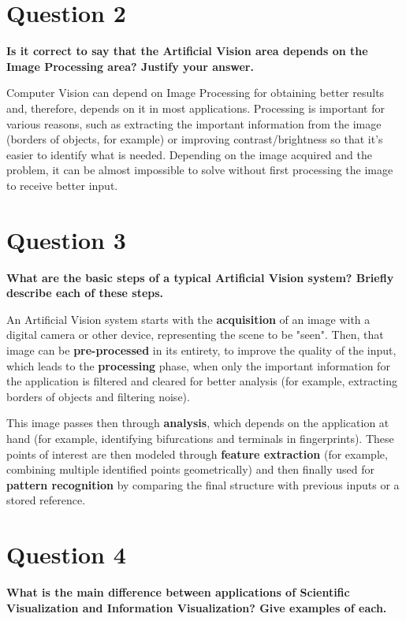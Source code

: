 \documentclass[12pt]{article}
\begin{document}
\section*{Question 2}
{\bfseries Is it correct to say that the Artificial Vision area depends on the Image Processing area?  Justify your answer.}

Computer Vision can depend on Image Processing for obtaining better results and, therefore, depends on it in most applications. Processing is important for various reasons, such as extracting the important information from the image (borders of objects, for example) or improving contrast/brightness so that it's easier to identify what is needed. Depending on the image acquired and the problem, it can be almost impossible to solve without first processing the image to receive better input.

\section*{Question 3}
{\bfseries What are the basic steps of a typical Artificial Vision system?  Briefly describe each of these steps.}

An Artificial Vision system starts with the \textbf{acquisition} of an image with a digital camera or other device, representing the scene to be "seen". Then, that image can be \textbf{pre-processed} in its entirety, to improve the quality of the input, which leads to the \textbf{processing} phase, when only the important information for the application is filtered and cleared for better analysis (for example, extracting borders of objects and filtering noise).

This image passes then through \textbf{analysis}, which depends on the application at hand (for example, identifying bifurcations and terminals in fingerprints). These points of interest are then modeled through \textbf{feature extraction} (for example, combining multiple identified points geometrically) and then finally used for \textbf{pattern recognition} by comparing the final structure with previous inputs or a stored reference.

\section*{Question 4}
{\bfseries What is the main difference between applications of Scientific Visualization and Information Visualization?  Give examples of each.}
\end{document}

